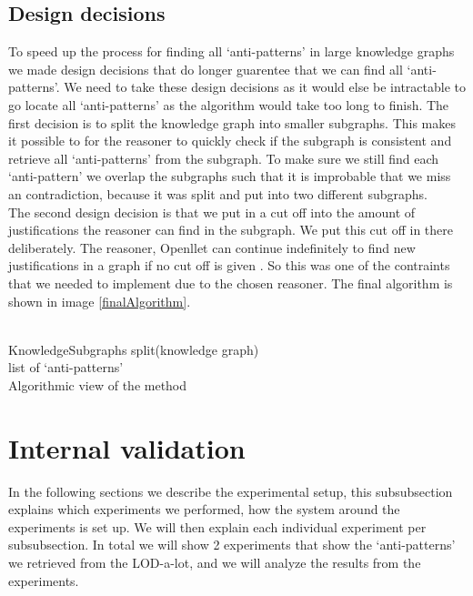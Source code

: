 \documentclass[11pt,letterpaper ,oneside ]{book}
\begin{document}
\section{Design decisions}
To speed up the process for finding all `anti-patterns' in large knowledge graphs we made design decisions that do longer guarentee that we can find all `anti-patterns'. We need to take these design decisions as it would else be intractable to go locate all `anti-patterns' as the algorithm would take too long to finish. 
The first decision is to split the knowledge graph into smaller subgraphs. This makes it possible to for the reasoner to quickly check if the subgraph is consistent and retrieve all `anti-patterns' from the subgraph. To make sure we still find each `anti-pattern' we overlap the subgraphs such that it is improbable that we miss an contradiction, because it was split and put into two different subgraphs.\\
The second design decision is that we put in a cut off into the amount of justifications the reasoner can find in the subgraph. We put this cut off in there deliberately. The reasoner, Openllet can continue indefinitely to find new justifications in a graph if no cut off is given \cite{Openllet:2019}. So this was one of the contraints that we needed to implement due to the chosen reasoner. 
The final algorithm is shown in image \ref{finalAlgorithm}.\\
\\
\begin{algorithm}
	KnowledgeSubgraphs split(knowledge graph)\\
	
	\Return list of `anti-patterns'\\
	\caption{Algorithmic view of the method}
	\label{finalAlgorithm}
\end{algorithm}

\newpage

\chapter{Internal validation}\label{Experiments}
In the following sections we describe the experimental setup, this subsubsection explains which experiments we performed, how the system around the experiments is set up. We will then explain each individual experiment per subsubsection. In total we will show 2 experiments that show the `anti-patterns' we retrieved from the LOD-a-lot, and we will analyze the results from the experiments.
\end{document}
